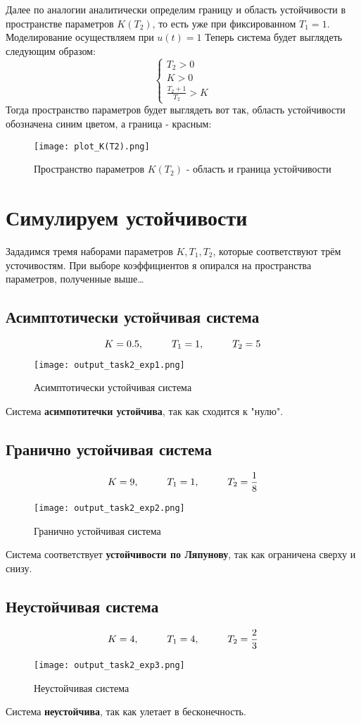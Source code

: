 Далее по аналогии аналитически определим границу и область устойчивости в пространстве параметров $K(T_2)$, то есть уже при фиксированном $T_1 = 1$. Моделирование осуществляем при $u(t)=1$
Теперь система будет выглядеть следующим образом:
$$
\begin{cases}
  T_2 > 0\\
  K > 0\\
  \frac{T_2+ 1}{T_2}>K
\end{cases}
$$ 
Тогда пространство параметров будет выглядеть вот так, область устойчивости обозначена синим цветом, а граница - красным:
\begin{figure}[ht]
  \centering
  \texttt{[image: plot\_K(T2).png]}
\caption{Пространство параметров $K(T_2)$ - область и граница устойчивости}
\end{figure}

\section{Симулируем устойчивости}
Зададимся тремя наборами параметров $K, T_1, T_2$, которые соответствуют трём усточивостям.
При выборе коэффициентов я опирался на пространства параметров, полученные выше\dots
\subsection{Асимптотически устойчивая система}
$$
K=0.5,\hspace*{1cm} T_1=1,\hspace*{1cm} T_2=5
$$
\begin{figure}[ht]
  \centering
  \texttt{[image: output\_task2\_exp1.png]}
\caption{Асимптотически устойчивая система}
\end{figure}
Система \textbf{асимпотитечки устойчива}, так как сходится к "нулю".
\newpage
\subsection{Гранично устойчивая система}
$$
K=9,\hspace*{1cm} T_1=1,\hspace*{1cm} T_2=\frac{1}{8}
$$
\begin{figure}[ht]
  \centering
  \texttt{[image: output\_task2\_exp2.png]}
\caption{Гранично устойчивая система}
\end{figure}
Система соответствует \textbf{устойчивости по Ляпунову}, так как ограничена сверху и снизу.
\newpage
\subsection{Неустойчивая система}
$$
K=4,\hspace*{1cm} T_1=4,\hspace*{1cm} T_2= \frac{2}{3}
$$
\begin{figure}[ht]
  \centering
  \texttt{[image: output\_task2\_exp3.png]}
\caption{Неустойчивая система}
\end{figure}
Система \textbf{неустойчива}, так как улетает в бесконечность.

